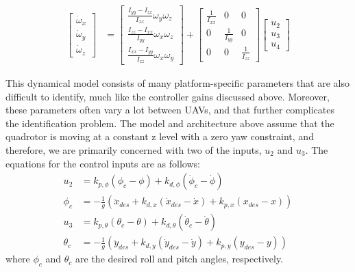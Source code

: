 \documentclass[letterpaper, 10 pt, conference]{ieeeconf}  %
\begin{document}
\begin{equation}
\begin{aligned}
	\begin{bmatrix}\dot{\omega}_{x} \\ \dot{\omega}_{y} \\ \dot{\omega}_{z}\end{bmatrix} &= \begin{bmatrix}\frac{I_{yy} - I_{zz}}{I_{xx}} \omega_{y}\omega_{z}\\ \frac{I_{zz} - I_{xx}}{I_{yy}} \omega_{x}\omega_{z} \\ \frac{I_{xx} - I_{yy}}{I_{zz}} \omega_{x}\omega_{y} \end{bmatrix} +  \begin{bmatrix}\frac{1}{I_{xx}} & 0 & 0\\ 0 & \frac{1}{I_{yy}} & 0\\ 0 & 0 & \frac{1}{I_{zz}}\end{bmatrix} \begin{bmatrix}u_{2} \\ u_{3} \\ u_{4} \end{bmatrix}
	\end{aligned}
	\label{eq:quadrotor_dynamics} \nonumber
\end{equation} \cite{esencite}

This dynamical model consists of many platform-specific parameters that are also difficult to identify, much like the controller gains discussed above. Moreover, these parameters often vary a lot between UAVs, and that further complicates the identification problem. The model and architecture above assume that the quadrotor is moving at a constant z level with a zero yaw constraint, and therefore, we are primarily concerned with two of the inputs, $u_2$ and $u_3$. The equations for the control inputs are as follows:
\begin{align} \label{eq:cinputs}
    u_2 &= k_{p,\phi}(\phi_c-\phi) + k_{d,\phi}(\dot{\phi}_c - \dot{\phi}) \nonumber \\
    \phi_c &= -\frac{1}{g}(\ddot{x}_{des} + k_{d,x}(\dot{x}_{des}-\dot{x}) + k_{p,x}(x_{des}-x)) \nonumber \\
    u_3 &= k_{p,\theta}(\theta_c-\theta) + k_{d,\theta}(\dot{\theta}_c - \dot{\theta}) \nonumber \\
    \theta_c &= -\frac{1}{g}(\ddot{y}_{des} + k_{d,y}(\dot{y}_{des}-\dot{y}) + k_{p,y}(y_{des}-y))
\end{align}
where $\phi_c$ and $\theta_c$ are the desired roll and pitch angles, respectively.
\end{document}
